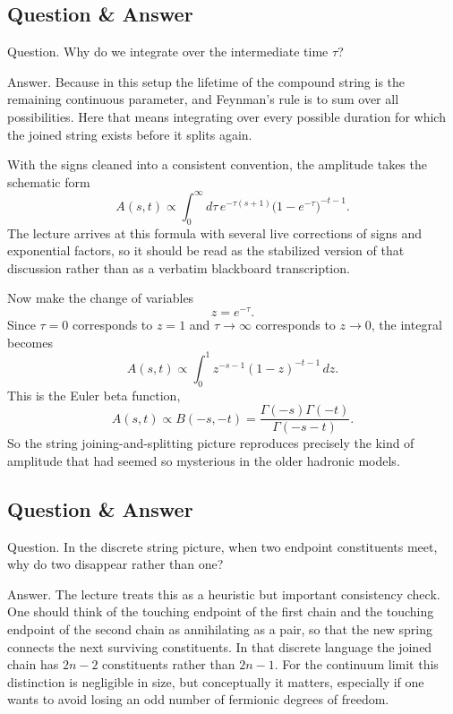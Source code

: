 \subsection{Question \& Answer}

Question. Why do we integrate over the intermediate time \(\tau\)?

Answer. Because in this setup the lifetime of the compound string is the remaining continuous parameter, and Feynman's rule is to sum over all possibilities. Here that means integrating over every possible duration for which the joined string exists before it splits again.

With the signs cleaned into a consistent convention, the amplitude takes the schematic form
\begin{equation}
A(s,t)\propto \int_0^\infty d\tau\, e^{-\tau(s+1)}\bigl(1-e^{-\tau}\bigr)^{-t-1}.
\end{equation}
The lecture arrives at this formula with several live corrections of signs and exponential factors, so it should be read as the stabilized version of that discussion rather than as a verbatim blackboard transcription.

Now make the change of variables
\begin{equation}
z=e^{-\tau}.
\end{equation}
Since \(\tau=0\) corresponds to \(z=1\) and \(\tau\to\infty\) corresponds to \(z\to0\), the integral becomes
\begin{equation}
A(s,t)\propto \int_0^1 z^{-s-1}(1-z)^{-t-1}\,dz.
\end{equation}
This is the Euler beta function,
\begin{equation}
A(s,t)\propto B(-s,-t)=\frac{\Gamma(-s)\Gamma(-t)}{\Gamma(-s-t)}.
\end{equation}
So the string joining-and-splitting picture reproduces precisely the kind of amplitude that had seemed so mysterious in the older hadronic models.

\subsection{Question \& Answer}

Question. In the discrete string picture, when two endpoint constituents meet, why do two disappear rather than one?

Answer. The lecture treats this as a heuristic but important consistency check. One should think of the touching endpoint of the first chain and the touching endpoint of the second chain as annihilating as a pair, so that the new spring connects the next surviving constituents. In that discrete language the joined chain has \(2n-2\) constituents rather than \(2n-1\). For the continuum limit this distinction is negligible in size, but conceptually it matters, especially if one wants to avoid losing an odd number of fermionic degrees of freedom.

